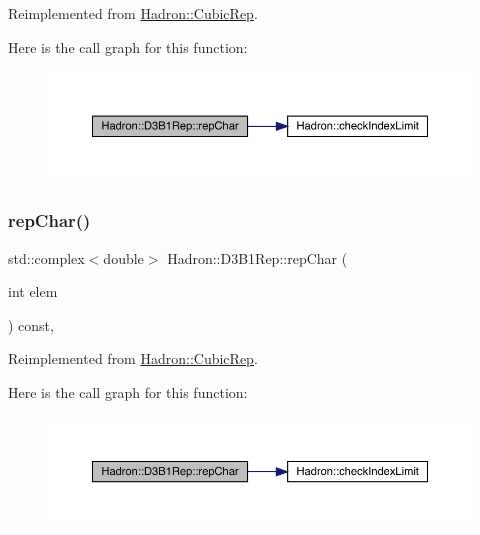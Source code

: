 Reimplemented from \mbox{\hyperlink{structHadron_1_1CubicRep_af45227106e8e715e84b0af69cd3b36f8}{Hadron\+::\+Cubic\+Rep}}.

Here is the call graph for this function\+:
\nopagebreak
\begin{figure}[H]
\begin{center}
\leavevmode
\includegraphics[width=350pt]{de/dc2/structHadron_1_1D3B1Rep_a3a5bf413079f99bedafb7134af0e5af1_cgraph}
\end{center}
\end{figure}
\mbox{\label{structHadron_1_1D3B1Rep_a3a5bf413079f99bedafb7134af0e5af1}} 
\subsubsection{\texorpdfstring{repChar()}{repChar()}\hspace{0.1cm}{\footnotesize\ttfamily [3/3]}}
{\footnotesize\ttfamily std\+::complex$<$double$>$ Hadron\+::\+D3\+B1\+Rep\+::rep\+Char (\begin{DoxyParamCaption}\item[{int}]{elem }\end{DoxyParamCaption}) const\hspace{0.3cm}{\ttfamily [inline]}, {\ttfamily [virtual]}}



Reimplemented from \mbox{\hyperlink{structHadron_1_1CubicRep_af45227106e8e715e84b0af69cd3b36f8}{Hadron\+::\+Cubic\+Rep}}.

Here is the call graph for this function\+:
\nopagebreak
\begin{figure}[H]
\begin{center}
\leavevmode
\includegraphics[width=350pt]{de/dc2/structHadron_1_1D3B1Rep_a3a5bf413079f99bedafb7134af0e5af1_cgraph}
\end{center}
\end{figure}
\mbox{\label{structHadron_1_1D3B1Rep_a2a0563aa28c476f89e8b13f3a95b7cfd}} 
